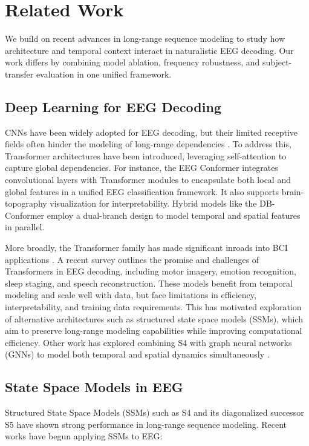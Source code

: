 \documentclass{article}
\begin{document}
\section{Related Work}
\label{sec:related}

We build on recent advances in long-range sequence modeling to study how architecture and temporal context interact in naturalistic EEG decoding. Our work differs by combining model ablation, frequency robustness, and subject-transfer evaluation in one unified framework.

\subsection{Deep Learning for EEG Decoding}

CNNs have been widely adopted for EEG decoding, but their limited receptive fields often hinder the modeling of long-range dependencies \cite{roy2019deep,schirrmeister2017deep}. To address this, Transformer architectures have been introduced, leveraging self-attention to capture global dependencies. For instance, the EEG Conformer \cite{song2023eeg} integrates convolutional layers with Transformer modules to encapsulate both local and global features in a unified EEG classification framework. It also supports brain-topography visualization for interpretability. Hybrid models like the DB-Conformer \cite{wang2024dbconformer} employ a dual-branch design to model temporal and spatial features in parallel.

More broadly, the Transformer family has made significant inroads into BCI applications \cite{abibullaev2023transformerreview}. A recent survey outlines the promise and challenges of Transformers in EEG decoding, including motor imagery, emotion recognition, sleep staging, and speech reconstruction. These models benefit from temporal modeling and scale well with data, but face limitations in efficiency, interpretability, and training data requirements. This has motivated exploration of alternative architectures such as structured state space models (SSMs), which aim to preserve long-range modeling capabilities while improving computational efficiency. Other work has explored combining S4 with graph neural networks (GNNs) to model both temporal and spatial dynamics simultaneously \cite{tang2023graphs4mer}.

\subsection*{State Space Models in EEG}
Structured State Space Models (SSMs) such as S4 \cite{gu2022efficientlymodelinglongsequences} and its diagonalized successor S5 \cite{gu2023mamba} have shown strong performance in long-range sequence modeling. Recent works have begun applying SSMs to EEG:
\end{document}
